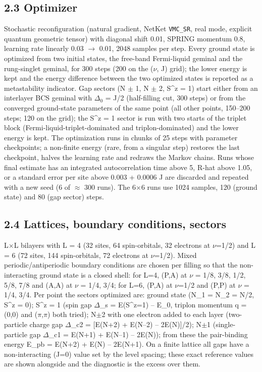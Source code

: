 \documentclass[10pt]{article}
\begin{document}
\subsection*{2.3 Optimizer}

Stochastic reconfiguration (natural gradient, NetKet \texttt{VMC\_SR}, real mode, explicit quantum geometric tensor) with diagonal shift 0.01, SPRING momentum 0.8, learning rate linearly 0.03 $\to$ 0.01, 2048 samples per step. Every ground state is optimized from two initial states, the free-band Fermi-liquid geminal and the rung-singlet geminal, for 300 steps (200 on the ($\nu$, J) grid); the lower energy is kept and the energy difference between the two optimized states is reported as a metastability indicator. Gap sectors (N $\pm$ 1, N $\pm$ 2, S\^{}z = 1) start either from an interlayer BCS geminal with $\Delta$$_0$ = J/2 (half-filling cut, 300 steps) or from the converged ground-state parameters of the same point (all other points, 150--200 steps; 120 on the grid); the S\^{}z = 1 sector is run with two starts of the triplet block (Fermi-liquid-triplet-dominated and triplon-dominated) and the lower energy is kept. The optimization runs in chunks of 25 steps with parameter checkpoints; a non-finite energy (rare, from a singular step) restores the last checkpoint, halves the learning rate and redraws the Markov chains. Runs whose final estimate has an integrated autocorrelation time above 5, R-hat above 1.05, or a standard error per site above 0.003 + 0.0006 J are discarded and repeated with a new seed (6 of $\approx$ 300 runs). The 6$\times$6 runs use 1024 samples, 120 (ground state) and 80 (gap sector) steps.

\subsection*{2.4 Lattices, boundary conditions, sectors}

L$\times$L bilayers with L = 4 (32 sites, 64 spin-orbitals, 32 electrons at $\nu$=1/2) and L = 6 (72 sites, 144 spin-orbitals, 72 electrons at $\nu$=1/2). Mixed periodic/antiperiodic boundary conditions are chosen per filling so that the non-interacting ground state is a closed shell: for L=4, (P,A) at $\nu$ = 1/8, 3/8, 1/2, 5/8, 7/8 and (A,A) at $\nu$ = 1/4, 3/4; for L=6, (P,A) at $\nu$=1/2 and (P,P) at $\nu$ = 1/4, 3/4. Per point the sectors optimized are: ground state (N\_1 = N\_2 = N/2, S\^{}z = 0); S\^{}z = 1 (spin gap $\Delta$\_s = E(S\^{}z=1) -- E\_0, triplon momentum q = (0,0) and ($\pi$,$\pi$) both tried); N$\pm$2 with one electron added to each layer (two-particle charge gap $\Delta$\_c2 = [E(N+2) + E(N--2) -- 2E(N)]/2); N$\pm$1 (single-particle gap $\Delta$\_c1 = E(N+1) + E(N--1) -- 2E(N)); from these the pair-binding energy E\_pb = E(N+2) + E(N) -- 2E(N+1). On a finite lattice all gaps have a non-interacting (J=0) value set by the level spacing; these exact reference values are shown alongside and the diagnostic is the excess over them.
\end{document}
